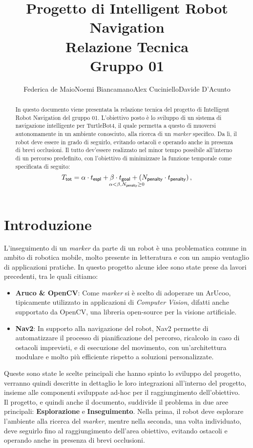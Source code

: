 \documentclass[12pt]{article}
\title{Progetto di Intelligent Robot Navigation \\ \large Relazione Tecnica\\ \Large Gruppo 01}
\author{Federica de Maio\quad Noemi Biancamano\quad Alex Cuciniello\quad Davide D'Acunto}
\date{}
\begin{document}
\maketitle
\begin{abstract}
In questo documento viene presentata la relazione tecnica del progetto di Intelligent Robot Navigation del gruppo 01. L'obiettivo posto è lo sviluppo di un sistema di navigazione intelligente per TurtleBot4, il quale permetta a questo di muoversi autonomamente in un ambiente conosciuto, alla ricerca di un \textit{marker} specifico. Da lì, il robot deve essere in grado di seguirlo, evitando ostacoli e operando anche in presenza di brevi occlusioni. Il tutto dev'essere realizzato nel minor tempo possibile all'interno di un percorso predefinito, con l'obiettivo di minimizzare la funzione temporale come specificata di seguito:
    $$T_{\mathsf{tot}}=\alpha\cdot t_{\mathsf{espl}}+\beta\cdot t_{\mathsf{goal}}+\left(N_{\mathsf{penalty}}\cdot t_{\mathsf{penalty}}\right), \atop\alpha<\beta,N_{\mathsf{penalty}}\ge 0$$
\end{abstract}
\tableofcontents

\newpage

\section{Introduzione}
L'inseguimento di un \textit{marker} da parte di un robot è una problematica comune in ambito di robotica mobile, molto presente in letteratura e con un ampio ventaglio di applicazioni pratiche. In questo progetto alcune idee sono state prese da lavori precedenti, tra le quali citiamo: \begin{itemize}
    \item \textbf{Aruco \& OpenCV}: Come \textit{marker} si è scelto di adoperare un ArUcoo, tipicamente utilizzato in applicazioni di \textit{Computer Vision}, difatti anche supportato da OpenCV, una libreria open-source per la visione artificiale. 
    \item \textbf{Nav2}: In supporto alla navigazione del robot, Nav2 permette di automatizzare il processo di pianificazione del percorso, ricalcolo in caso di ostacoli imprevisti, e di esecuzione del movimento, con un'architettura modulare e molto più efficiente rispetto a soluzioni personalizzate.
\end{itemize}
Queste sono state le scelte principali che hanno spinto lo sviluppo del progetto, verranno quindi descritte in dettaglio le loro integrazioni all'interno del progetto, insieme alle componenti sviluppate ad-hoc per il raggiungimento dell'obiettivo.
\\[1em]
Il progetto, e quindi anche il documento, suddivide il problema in due aree principali: \textbf{Esplorazione} e \textbf{Inseguimento}. Nella prima, il robot deve esplorare l'ambiente alla ricerca del \textit{marker}, mentre nella seconda, una volta individuato, deve seguirlo fino al raggiungimento dell'area obiettivo, evitando ostacoli e operando anche in presenza di brevi occlusioni.
\newpage
\end{document}
